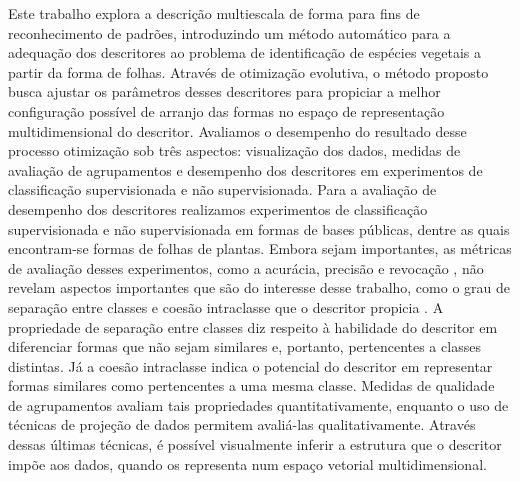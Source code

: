 Este trabalho explora a descrição multiescala de forma \cite{Costa:2009}  para fins de reconhecimento de padrões, introduzindo um método automático para a adequação dos descritores ao problema de identificação de espécies vegetais a partir da forma de folhas. Através de otimização evolutiva, o método proposto busca ajustar os parâmetros desses descritores para propiciar a melhor configuração possível de arranjo das formas no espaço de representação multidimensional do descritor. Avaliamos o desempenho do resultado desse processo otimização sob três aspectos: visualização dos dados, medidas de avaliação de agrupamentos e desempenho dos descritores em experimentos de classificação supervisionada e não supervisionada.   Para a avaliação de desempenho dos descritores realizamos experimentos de classificação supervisionada e não supervisionada em formas de bases públicas, dentre as quais encontram-se formas de folhas de plantas. Embora sejam importantes, as métricas de avaliação desses experimentos, como a acurácia, precisão e revocação  \cite{Ting2010}, não revelam aspectos importantes que são do interesse desse trabalho, como o grau de separação entre classes e coesão intraclasse que o descritor propicia \cite{Meta:2009}. A propriedade de separação entre classes diz respeito à habilidade do descritor em diferenciar formas que não sejam similares e, portanto, pertencentes a classes distintas. Já a coesão intraclasse indica o potencial do descritor em representar formas similares como pertencentes a uma mesma classe.  Medidas de qualidade de agrupamentos \cite{Meta:2009} avaliam tais propriedades quantitativamente, enquanto o uso de técnicas de projeção de dados \cite{Amorim201535} permitem avaliá-las qualitativamente. Através dessas últimas técnicas, é possível visualmente inferir a estrutura que o descritor impõe aos dados, quando os representa num espaço vetorial multidimensional. 




